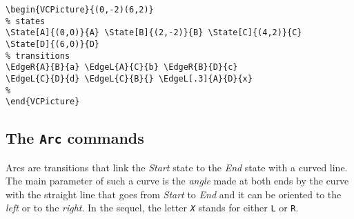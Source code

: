 \documentclass[11pt,twoside]{article}
\newlength{\parindenttemp} %
\newcommand{\noi}{\noindent}
\newlength{\jsIndent}%
\newlength{\ColSource}%
\newlength{\ColFigur}%
\begin{document}
\noi 
\hspace*{-\jsIndent}
\begin{minipage}[t]{\ColFigur}%
\par\vspace*{0mm}%
\bigskip 
\begin{center}
%
\end{center}
\end{minipage}%
\hspace*{1.2em}%
\begin{minipage}[t]{\ColSource}
\setlength{\parindent}{\parindenttemp}%
\par\vspace*{0mm}%
\footnotesize
\begin{verbatim}
\begin{VCPicture}{(0,-2)(6,2)}
% states
\State[A]{(0,0)}{A} \State[B]{(2,-2)}{B} \State[C]{(4,2)}{C}
\State[D]{(6,0)}{D}
% transitions 
\EdgeR{A}{B}{a} \EdgeL{A}{C}{b} \EdgeR{B}{D}{c} 
\EdgeL{C}{D}{d} \EdgeL{C}{B}{} \EdgeL[.3]{A}{D}{x}
%
\end{VCPicture}
\end{verbatim}
\normalsize
\end{minipage}%

\subsection{The \texttt{Arc} commands}\label{subsec.arc}

Arcs are transitions that link the {\sl Start} state to the {\sl End} 
state with a curved line.
The main parameter of such a curve is the \emph{angle} made at both 
ends by the curve with the straight line that goes from  {\sl Start} to 
{\sl End} and it can be oriented to the \emph{left} or to the 
\emph{right}.
In the sequel, the letter \texttt{\textsl{X}} stands for either \verb+L+ 
or \verb+R+. 
\end{document}
